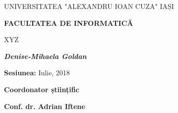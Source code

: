 \begin{center}
	\large{UNIVERSITATEA "ALEXANDRU IOAN CUZA" IAȘI} \\
	\vspace{0.4cm}
	
	\large{\textbf{FACULTATEA DE INFORMATICĂ}} \\
    \vspace{4cm}
    
	\LARGE{XYZ} \\
	\vspace{3cm}
	
	\large{\textbf{\textit{Denise-Mihaela Goldan}}}\\
	\vspace{3cm}
	
	\large{\textbf{Sesiunea:} Iulie, 2018}\\
	\vspace{3cm}
	
	\large{\textbf{Coordonator științific}}\\
	\vspace{0.4cm}
	
	\large{\textbf{Conf. dr. Adrian Iftene}}
\end{center}

\clearpage

\afterpage{\null\newpage}